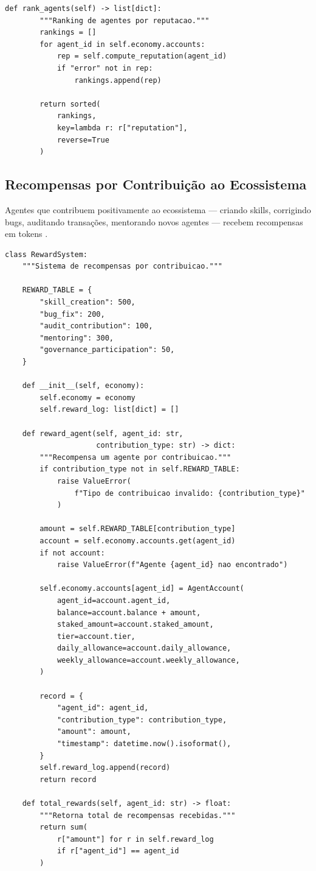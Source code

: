 \begin{lstlisting}[caption={Sistema de reputacao composta},
                  label={lst:reputacao}]
    def rank_agents(self) -> list[dict]:
        """Ranking de agentes por reputacao."""
        rankings = []
        for agent_id in self.economy.accounts:
            rep = self.compute_reputation(agent_id)
            if "error" not in rep:
                rankings.append(rep)

        return sorted(
            rankings,
            key=lambda r: r["reputation"],
            reverse=True
        )
\end{lstlisting}

\subsection{Recompensas por Contribuição ao Ecossistema}

Agentes que contribuem positivamente ao ecossistema — criando
skills, corrigindo bugs, auditando transações, mentorando novos
agentes — recebem recompensas em tokens \cite{opencode2026token}.

\begin{lstlisting}[caption={Sistema de recompensas},label={lst:reward}]
class RewardSystem:
    """Sistema de recompensas por contribuicao."""

    REWARD_TABLE = {
        "skill_creation": 500,
        "bug_fix": 200,
        "audit_contribution": 100,
        "mentoring": 300,
        "governance_participation": 50,
    }

    def __init__(self, economy):
        self.economy = economy
        self.reward_log: list[dict] = []

    def reward_agent(self, agent_id: str,
                     contribution_type: str) -> dict:
        """Recompensa um agente por contribuicao."""
        if contribution_type not in self.REWARD_TABLE:
            raise ValueError(
                f"Tipo de contribuicao invalido: {contribution_type}"
            )

        amount = self.REWARD_TABLE[contribution_type]
        account = self.economy.accounts.get(agent_id)
        if not account:
            raise ValueError(f"Agente {agent_id} nao encontrado")

        self.economy.accounts[agent_id] = AgentAccount(
            agent_id=account.agent_id,
            balance=account.balance + amount,
            staked_amount=account.staked_amount,
            tier=account.tier,
            daily_allowance=account.daily_allowance,
            weekly_allowance=account.weekly_allowance,
        )

        record = {
            "agent_id": agent_id,
            "contribution_type": contribution_type,
            "amount": amount,
            "timestamp": datetime.now().isoformat(),
        }
        self.reward_log.append(record)
        return record

    def total_rewards(self, agent_id: str) -> float:
        """Retorna total de recompensas recebidas."""
        return sum(
            r["amount"] for r in self.reward_log
            if r["agent_id"] == agent_id
        )
\end{lstlisting}

